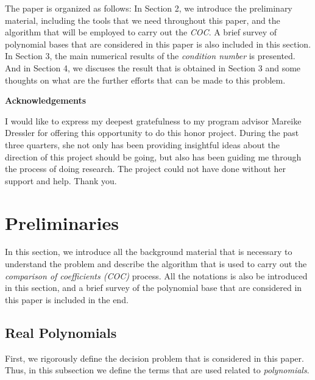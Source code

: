\documentclass[12pt]{amsart}
\numberwithin{equation}{section}
\theoremstyle{definition}
\numberwithin{thm}{section}
\begin{document}
The paper is organized as follows: In Section 2, we introduce the preliminary material, 
including the tools that we need throughout this paper, and the algorithm that will be employed to carry out the \emph{COC}.
A brief survey of polynomial bases that are considered in this paper is also included in this section. 
In Section 3, the main numerical results of the \emph{condition number} is presented. 
And in Section 4, we discuses the result that is obtained in Section 3 and some thoughts on what are the further efforts that can be made to this problem.



\newpage

\centerline{\textbf{Acknowledgements}}

I would like to express my deepest gratefulness to my program advisor Mareike Dressler for offering this opportunity to do this honor project. 
During the past three quarters, she not only has been providing insightful ideas about the direction of this project should be going, 
but also has been guiding me through the process of doing research. The project could not have done without her support and help. Thank you.

\newpage

\section{Preliminaries}
\label{Sec:Preliminaries}

In this section, we introduce all the background material that is necessary to
understand the problem and describe the algorithm that is used to carry out the \emph{comparison of coefficients (COC)}
process. All the notations is also be introduced in this section, 
and a brief survey of the polynomial base that are considered in this paper is included in the end.


\subsection{Real Polynomials}
\label{Sec:Real Polynomials}
First, we rigorously define the decision problem that is considered in this paper. 
Thus, in this subsection we define the terms that are used related to \emph{polynomials}.
\end{document}
